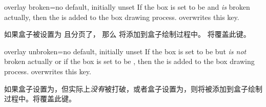 
\begin{docTcbKey}{overlay broken}{=}{no default, initially unset}
 If the box is set to be  and \emph{is} broken actually,
 then the  is added to the box drawing process.
  overwrites this key.

如果盒子被设置为  且分页了， 那么  将添加到盒子绘制过程中。  将覆盖此键。

\end{docTcbKey}

\begin{docTcbKey}{overlay unbroken}{=}{no default, initially unset}
 If the box is set to be  but \emph{is not} broken actually
 or if the box is set to be ,
 then the  is added to the box drawing process.
  overwrites this key.

如果盒子设置为，但实际上\emph{没有}被打破，或者盒子设置为，则将被添加到盒子绘制过程中。将覆盖此键。

\end{docTcbKey}

